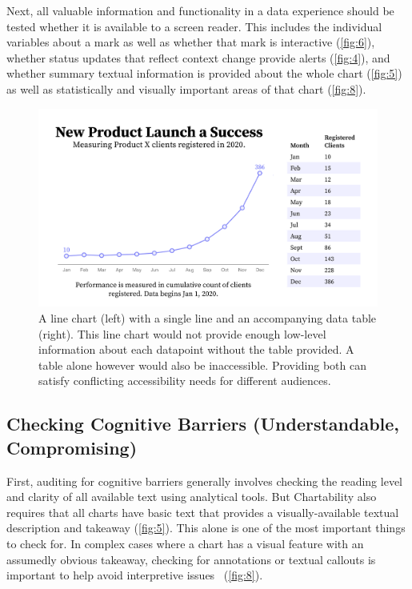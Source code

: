 \documentclass{egpubl}
\begin{document}
Next, all valuable information and functionality in a data experience should be tested whether it is available to a screen reader. This includes the individual variables about a mark as well as whether that mark is interactive (\autoref{fig:6}), whether status updates that reflect context change provide alerts (\autoref{fig:4}), and whether summary textual information is provided about the whole chart (\autoref{fig:5}) as well as statistically and visually important areas of that chart (\autoref{fig:8}). 

\begin{figure}
    \centering
    \includegraphics[width=\linewidth]{figures/figure 7.png}
    \caption{A line chart (left) with a single line and an accompanying data table (right). This line chart would not provide enough low-level information about each datapoint without the table provided. A table alone however would also be inaccessible. Providing both can satisfy conflicting accessibility needs for different audiences.}
    \label{fig:7}
\end{figure}

\subsection{Checking Cognitive Barriers (Understandable, Compromising)}
First, auditing for cognitive barriers generally involves checking the reading level and clarity of all available text using analytical tools. But Chartability also requires that all charts have basic text that provides a visually-available textual description and takeaway (\autoref{fig:5}). This alone is one of the most important things to check for. In complex cases where a chart has a visual feature with an assumedly obvious takeaway, checking for annotations or textual callouts is important to help avoid interpretive issues~\cite{xiong_curse_2020} (\autoref{fig:8}).
\end{document}
